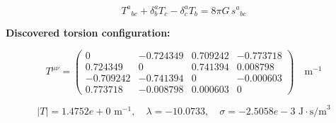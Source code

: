 
\begin{equation}
  T^a{}_{bc} + \delta^a_b T_c - \delta^a_c T_b = 8\pi G \, s^a{}_{bc}
\end{equation}

\textbf{Discovered torsion configuration:}

\begin{equation}
  T^{\mu\nu} = \begin{pmatrix}
    0 & -0.724349 & 0.709242 & -0.773718 \\
    0.724349 & 0 & 0.741394 & 0.008798 \\
    -0.709242 & -0.741394 & 0 & -0.000603 \\
    0.773718 & -0.008798 & 0.000603 & 0
  \end{pmatrix} \quad \text{m}^{-1}
\end{equation}

\begin{equation}
  |T| = 1.4752e+0 \text{ m}^{-1}, \quad
  \lambda = -10.0733, \quad
  \sigma = -2.5058e-3 \text{ J}\cdot\text{s/m}^3
\end{equation}
